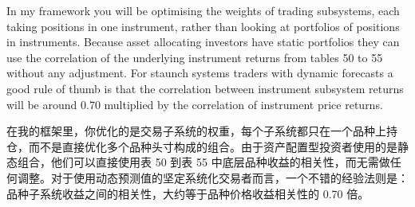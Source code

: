 \begin{bilingualtableblock} \begingroup \scriptsize \setlength{\tabcolsep}{3pt} \renewcommand{\arraystretch}{1.08} \noindent
{}
\endgroup \end{bilingualtableblock}

\begin{englishblock} In my framework you will be optimising the weights of trading subsystems, each taking positions in one instrument, rather than looking at portfolios of positions in instruments. Because asset allocating investors have static portfolios they can use the correlation of the underlying instrument returns from tables 50 to 55 without any adjustment. For staunch systems traders with dynamic forecasts a good rule of thumb is that the correlation between instrument subsystem returns will be around 0.70 multiplied by the correlation of instrument price returns. \end{englishblock}

\begin{chineseblock}在我的框架里，你优化的是交易子系统的权重，每个子系统都只在一个品种上持仓，而不是直接优化多个品种头寸构成的组合。由于资产配置型投资者使用的是静态组合，他们可以直接使用表 50 到表 55 中底层品种收益的相关性，而无需做任何调整。对于使用动态预测值的坚定系统化交易者而言，一个不错的经验法则是：品种子系统收益之间的相关性，大约等于品种价格收益相关性的 0.70 倍。\end{chineseblock}

